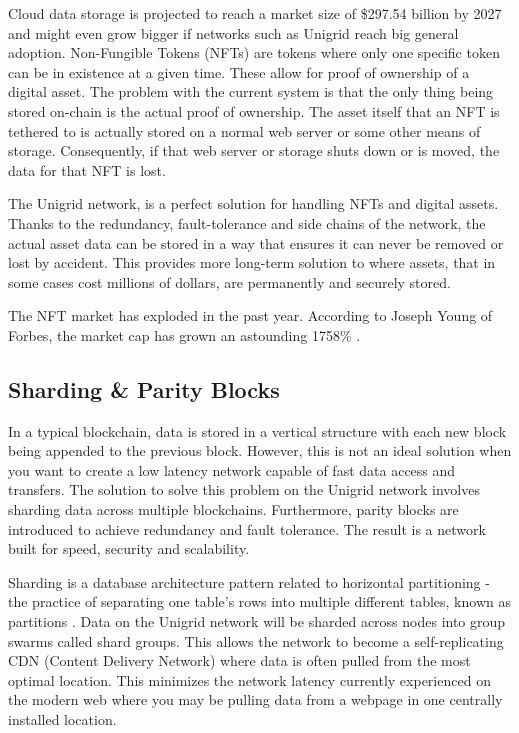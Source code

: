 \documentclass{article}
\begin{document}
\noindent Cloud data storage is projected to reach a market size of \$297.54 billion by 2027 \cite{fort2021} and might even grow bigger if networks such as Unigrid reach big general adoption. Non-Fungible Tokens (NFTs) are tokens where only one specific token can be in existence at a given time. These allow for proof of ownership of a digital asset. The problem with the current system is that the only thing being stored on-chain is the actual proof of ownership. The asset itself that an NFT is tethered to is actually stored on a normal web server or some other means of storage. Consequently, if that web server or storage shuts down or is moved, the data for that NFT is lost.

The Unigrid network, is a perfect solution for handling NFTs and digital assets. Thanks to the redundancy, fault-tolerance and side chains of the network, the actual asset data can be stored in a way that ensures it can never be removed or lost by accident. This provides more long-term solution to where assets, that in some cases cost millions of dollars, are permanently and securely stored.

The NFT market has exploded in the past year. According to Joseph Young of Forbes, the market cap has grown an astounding 1758\% \cite{young2021}.

\subsection{Sharding \& Parity Blocks}
In a typical blockchain, data is stored in a vertical structure with each new block being appended to the previous block. However, this is not an ideal solution when you want to create a low latency network capable of fast data access and transfers. The solution to solve this problem on the Unigrid network involves sharding data across multiple blockchains. Furthermore, parity blocks are introduced to achieve redundancy and fault tolerance. The result is a network built for speed, security and scalability.

Sharding is a database architecture pattern related to horizontal partitioning - the practice of separating one table’s rows into multiple different tables, known as partitions \cite{mark2019}. Data on the Unigrid network will be sharded across nodes into group swarms called shard groups. This allows the network to become a self-replicating CDN (Content Delivery Network) where data is often pulled from the most optimal location. This minimizes the network latency currently experienced on the modern web where you may be pulling data from a webpage in one centrally installed location.
\end{document}

